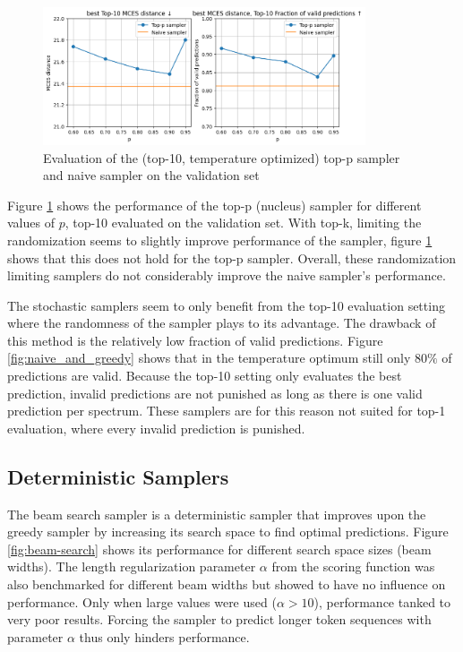 \begin{figure}[h]
    \centering
    \includegraphics[width=0.85\textwidth]{figures/results/samplers/top-p.png}
    \caption{Evaluation of the (top-10, temperature optimized) top-p sampler and naive sampler on the validation set}
    \label{fig:top-p}
\end{figure}

Figure \ref{fig:top-p} shows the performance of the top-p (nucleus) sampler for different values of $p$, top-10 evaluated on the validation set.
With top-k, limiting the randomization seems to slightly improve performance of the sampler, figure \ref{fig:top-p} shows that this does not hold for the top-p sampler.
Overall, these randomization limiting samplers do not considerably improve the naive sampler's performance.

The stochastic samplers seem to only benefit from the top-10 evaluation setting where the randomness of the sampler plays to its advantage.
The drawback of this method is the relatively low fraction of valid predictions.
Figure \ref{fig:naive_and_greedy} shows that in the temperature optimum still only $80\%$ of predictions are valid.
Because the top-10 setting only evaluates the best prediction, invalid predictions are not punished as long as there is one valid prediction per spectrum.
These samplers are for this reason not suited for top-1 evaluation, where every invalid prediction is punished.


\subsection{Deterministic Samplers}

The beam search sampler is a deterministic sampler that improves upon the greedy sampler by increasing its search space to find optimal predictions.
Figure \ref{fig:beam-search} shows its performance for different search space sizes (beam widths).
The length regularization parameter $\alpha$ from the scoring function was also benchmarked for different beam widths but showed to have no influence on performance.
Only when large values were used ($\alpha > 10$), performance tanked to very poor results.
Forcing the sampler to predict longer token sequences with parameter $\alpha$ thus only hinders performance.

